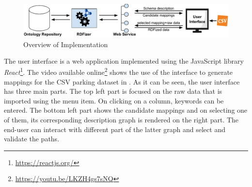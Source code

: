 \begin{figure}[h]
	\centering
	\includegraphics[scale=0.50]{images/OverviewImplementation.pdf}
	\caption{Overview of Implementation}
	\label{fig:OverviewImplementation}
\end{figure}

The user interface is a web application implemented using the JavaScript library \emph{React}\footnote{\url{https://reactjs.org/}}. The video available online\footnote{\url{https://youtu.be/LKZH4gs7sNQ}} shows the use of the interface to generate mappings for the CSV parking dataset in . 
As it can be seen, the user interface has three main parts. The top left part is focused on the raw data that is imported using the  menu item. On clicking on a column, keywords can be entered. The bottom left part shows the candidate mappings and on selecting one of them, its corresponding description graph is rendered on the right part. The end-user can interact with different part of the latter graph and select and validate the paths. 

